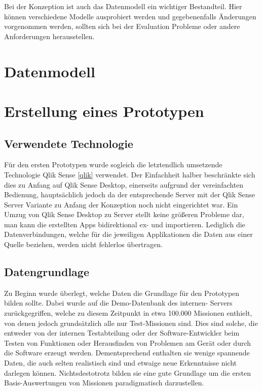 Bei der Konzeption ist auch das Datenmodell ein wichtiger Bestandteil. 
Hier können verschiedene Modelle ausprobiert werden und gegebenenfalls Änderungen vorgenommen werden, sollten sich bei der Evaluation Probleme oder andere Anforderungen herausstellen.

\section{Datenmodell}

\section{Erstellung eines Prototypen}
\subsection{Verwendete Technologie}
Für den ersten Prototypen wurde sogleich die letztendlich umsetzende Technologie Qlik Sense \ref{qlik} verwendet. 
Der Einfachheit halber beschränkte sich dies zu Anfang auf Qlik Sense Desktop, einerseits aufgrund der vereinfachten Bedienung, hauptsächlich jedoch da der entsprechende Server mit der Qlik Sense Server Variante zu Anfang der Konzeption noch nicht eingerichtet war. 
Ein Umzug von Qlik Sense Desktop zu Server stellt keine größeren Probleme dar, man kann die erstellten Apps bidirektional ex- und importieren. 
Lediglich die Datenverbindungen, welche für die jeweiligen Applikationen die Daten aus einer Quelle beziehen, werden nicht fehlerlos übertragen.

\subsection{Datengrundlage}
Zu Beginn wurde überlegt, welche Daten die Grundlage für den Prototypen bilden sollte.
Dabei wurde auf die Demo-Datenbank des internen\cweba - Servers zurückgegriffen, welche zu diesem Zeitpunkt in etwa 100.000 Missionen enthielt, von denen jedoch grundsätzlich alle nur Test-Missionen sind. 
Dies sind solche, die entweder von der internen Testabteilung oder der Software-Entwickler beim Testen von Funktionen oder Herausfinden von Problemen am Gerät oder durch die Software erzeugt werden. 
Dementsprechend enthalten sie wenige spannende Daten, die auch selten realistisch sind und etwaige neue Erkenntnisse nicht darlegen können. 
Nichtsdestotrotz bilden sie eine gute Grundlage um die ersten Basis-Auswertungen von Missionen paradigmatisch darzustellen. 

